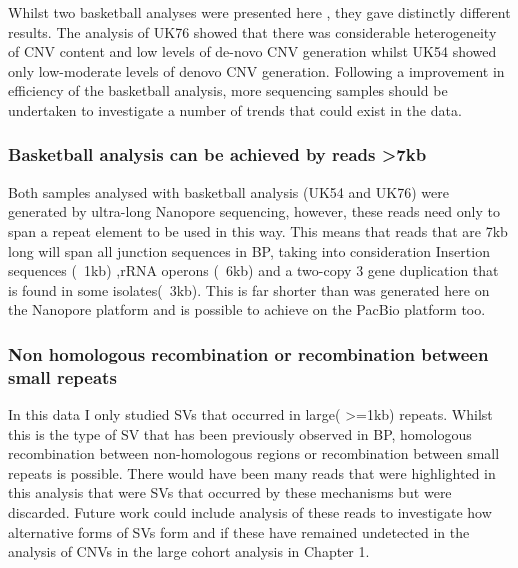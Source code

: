 \documentclass{article}
\begin{document}
Whilst two basketball analyses were presented here , they gave distinctly different results. The analysis of UK76 showed that there was considerable heterogeneity of CNV content and low levels of de-novo CNV generation whilst UK54 showed only low-moderate levels of denovo CNV generation. Following a improvement in efficiency of the basketball analysis, more sequencing samples should be undertaken to investigate a number of trends that could exist in the data.

\subsubsection{Basketball analysis can be achieved by reads >7kb}

Both samples analysed with basketball analysis (UK54 and UK76)  were generated by ultra-long Nanopore sequencing, however, these reads need only to span a repeat element to be used in this way. This means that reads that are 7kb long will span all junction sequences in BP, taking into consideration Insertion sequences (~1kb) ,rRNA operons (~6kb) and a two-copy 3 gene duplication that is found in some isolates(~3kb). This is far shorter than was generated here on the Nanopore platform and is possible to achieve on the PacBio platform too.



\subsubsection{Non homologous recombination or recombination between small repeats}

In this data I only studied SVs that occurred in large( >=1kb) repeats. Whilst this is the type of SV that has been previously observed in BP,  homologous recombination between non-homologous regions or recombination between small repeats is possible. There would have been many reads that were highlighted in this analysis that were SVs that occurred by these mechanisms but were discarded. Future work could include analysis of these reads to investigate how alternative forms of SVs form and if these have remained undetected in the analysis of CNVs in the large cohort analysis in Chapter 1.
\end{document}
